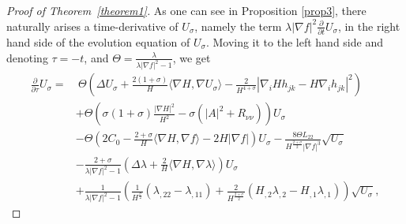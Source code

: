 \documentclass[12pt,a4paper]{amsart}
\begin{document}
\begin{proof}[Proof of Theorem~\ref{theorem1}]
As one can see in Proposition \ref{prop3}, there naturally arises a time-derivative of $U_\sigma$,
namely the term $\lambda|\nabla f|^2\frac{\partial}{\partial t}U_\sigma$,
in the right hand side of the evolution equation of $U_\sigma$. Moving it to the left hand side and denoting $\tau=-t$,
and $\Theta=\frac{\lambda}{\lambda|\nabla f|^2-1}$, we get
\begin{align*}
\frac{\partial}{\partial \tau}U_\sigma
=&\ \Theta\left(\Delta U_{\sigma}+\frac{2(1+\sigma)}{H}\langle\nabla H,\nabla U_{\sigma}\rangle
 -\frac{2}{H^{4+\sigma}}|\nabla_iHh_{jk}-H\nabla_ih_{jk}|^2\right) \\
&+\Theta\left(\sigma(1+\sigma)\frac{|\nabla H|^2}{H^2}-\sigma(|A|^2+R_{\nu\nu})\right)U_\sigma\\
&-\Theta\left(2C_0-\frac{2+\sigma}{H}\langle\nabla H,\nabla f\rangle-2H|\nabla f|\right)U_{\sigma}
-\frac{8\Theta L_{22}}{H^{\frac{2+\sigma}{2}}|\nabla f|^{3}}\sqrt{U_\sigma}\\
&- \frac{2+\sigma}{\lambda|\nabla f|^2-1}\left(\Delta\lambda+\frac{2}{H}\langle\nabla H,\nabla\lambda\rangle\right)U_{\sigma} \\
&+ \frac{1}{\lambda|\nabla f|^2-1}\left(\frac{1}{H^{\frac{\sigma}{2}}}(\lambda_{,22}-\lambda_{,11})
+\frac{2}{H^{\frac{2+\sigma}{2}}}(H_{,2}\lambda_{,2}-H_{,1}\lambda_{,1})\right)\sqrt{U_\sigma},
\end{align*}


\end{proof}
\end{document}
